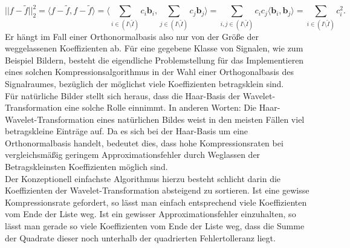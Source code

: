 \documentclass{article}
\begin{document}
%
\[
||f-\tilde{f}||_2^2 
= \langle f-\tilde{f}, f-\tilde{f} \rangle 
= \langle \sum_{i \in (I \setminus \tilde{I})} c_i \mathbf{b}_i , \sum_{j \in (I \setminus \tilde{I})} c_j \mathbf{b}_j \rangle 
= \sum_{i,j \in (I \setminus \tilde{I})} c_i c_j \langle \mathbf{b}_i , \mathbf{b}_j \rangle 
= \sum_{i \in (I \setminus \tilde{I})} c_i^2
.
\]
%
Er hängt im Fall einer Orthonormalbasis also nur von der Größe der weggelassenen Koeffizienten ab. Für eine gegebene Klasse von Signalen, wie zum Beispiel Bildern, besteht die eigendliche Problemstellung für das Implementieren eines solchen Kompressionsalgorithmus in der Wahl einer Orthogonalbasis des Signalraumes, bezüglich der möglichst viele Koeffizienten betragsklein sind.\\
Für natürliche Bilder stellt sich heraus, dass die Haar-Basis der Wavelet-Transformation eine solche Rolle einnimmt. In anderen Worten: Die Haar-Wavelet-Transformation eines natürlichen Bildes weist in den meisten Fällen viel betragskleine Einträge auf. Da es sich bei der Haar-Basis um eine Orthonormalbasis handelt, bedeutet dies, dass hohe Kompressionsraten bei vergleichsmäßig geringem Approximationsfehler durch Weglassen der Betragskleinsten Koeffizienten möglich sind. \\
Der Konzeptionell einfachste Algorithmus hierzu besteht schlicht darin die Koeffizienten der Wavelet-Transformation absteigend zu sortieren. Ist eine gewisse Kompressionsrate gefordert, so lässt man einfach entsprechend viele Koeffizienten vom Ende der Liste weg. Ist ein gewisser Approximationsfehler einzuhalten, so lässt man gerade so viele Koeffizienten vom Ende der Liste weg, dass die Summe der Quadrate dieser noch unterhalb der quadrierten Fehlertolleranz liegt.
%
%
%
%
%
\end{document}
